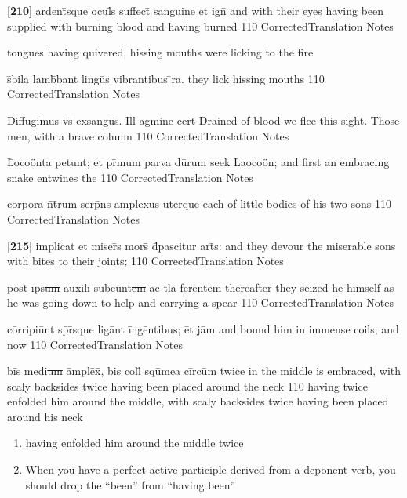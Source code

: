 \latline
  {[\textbf{210}] ardent\={\macron {\i}}sque ocul\={}s suffect\={\macron {\i}} sanguine et ign\={\macron {\i}}}
  { and with their eyes having been supplied with burning blood and having burned  }
  {110}
  { CorrectedTranslation }
  { Notes }
 
tongues having quivered, hissing mouths were licking to the fire

\latline
  {s\={\macron {\i}}bila lamb\={}bant lingu\={\macron {\i}}s vibrantibus \={}ra.}
  { they lick hissing mouths  }
  {110}
  { CorrectedTranslation }
  { Notes }


\latline
  {Diffugimus v\={\macron {\i}}s\={} exsangu\={}s.  Ill\={\macron {\i}} agmine cert\={}}
  { Drained of blood we flee this sight.  Those men, with a brave column }
  {110}
  { CorrectedTranslation }
  { Notes }


\latline
  {L\={}oco\"{o}nta petunt; et pr\={\macron {\i}}mum parva du\={}rum}
  { seek Laoco\"on; and first an embracing snake entwines the  }
  {110}
  { CorrectedTranslation }
  { Notes }


\latline
  {corpora n\={}t\={}rum serp\={}ns amplexus uterque}
  { each of little bodies of his two sons }
  {110}
  { CorrectedTranslation }
  { Notes }


\latline
  {[\textbf{215}] implicat et miser\={}s mors\={} d\={}pascitur art\={}s:}
  { and they devour the miserable sons with bites to their joints; }
  {110}
  { CorrectedTranslation }
  { Notes }


\latline
  {p\=ost \=ips\sout{um }\={au}x\-il\-i\={} s\-ub\-e\=unt\sout{em }\=ac t\={}l\-a f\-er\=ent\=em}
  { thereafter they seized he himself as he was going down to help and carrying a spear }
  {110}
  { CorrectedTranslation }
  { Notes }


\latline
  {c\=orr\-ip\-i\=unt sp\={\macron {\i}}r\={\macron {\i}}squ\-e l\-ig\=ant \=ing\=ent\-ib\-us; \=et j\=am}
  { and bound him in immense coils; and now  }
  {110}
  { CorrectedTranslation }
  { Notes }


\latline
  {b\=is m\-ed\-i\sout{um }\=ampl\=ex\={\macron {\i}}, b\-is c\-oll\={} squ\={}m\-e\-a c\=irc\=um}
  { twice in the middle is embraced, with scaly backsides twice having been placed around the neck   }
  {110}
  { having twice enfolded him around the middle, with scaly backsides twice having been placed around his neck }
  { \begin{enumerate}
  	\item having enfolded him around the middle twice
  	\item When you have a perfect active participle derived from a deponent verb, you should drop the ``been'' from ``having been''
  \end{enumerate} }


